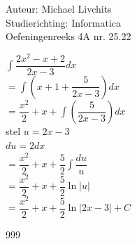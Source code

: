 \documentclass[a4paper]{article}
\begin{document}
  
\noindent \large Auteur: Michael Livchits \\
\noindent \large Studierichting: Informatica\\
\noindent \large Oefeningenreeks 4A nr. 25.22\\

\medskip

\normalsize

$\displaystyle\int\dfrac{2x^2-x+2}{2x-3}dx$\\

$= \displaystyle\int\left(x+1+\dfrac{5}{2x-3}\right)dx$\\

$= \dfrac{x^2}{2}+x+\displaystyle\int\left(\dfrac{5}{2x-3}\right)dx$\\

stel $u = 2x-3$\\

$du = 2dx$\\

$= \dfrac{x^2}{2}+x+\displaystyle\dfrac{5}{2}\int\dfrac{du}{u}$\\

$= \dfrac{x^2}{2}+x+\displaystyle\dfrac{5}{2}\ln|u|$\\

$= \dfrac{x^2}{2}+x+\displaystyle\dfrac{5}{2}\ln|2x-3|+C$\\

\begin{thebibliography}{999}
\end{thebibliography}
\end{document}
